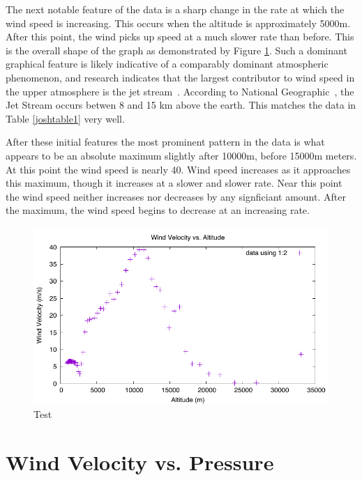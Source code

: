 \documentclass{article}
\begin{document}
The next notable feature of the data is a sharp change in the rate at which the wind speed is increasing.  This occurs when the altitude is approximately 5000\si{m}. After this point, the wind picks up speed at a much slower rate than before.  This is the overall shape of the graph as demonstrated by Figure \ref{josh1}.  Such a dominant graphical feature is likely indicative of a comparably dominant atmospheric phenomenon, and research indicates that the largest contributor to wind speed in the upper atmosphere is the jet stream~\cite{National-Geographic}.  According to National Geographic~\cite{National-Geographic}, the Jet Stream occurs betwen 8 and 15 \si{km} above the earth.  This matches the data in Table \ref{joshtable1} very well.

After these initial features the most prominent pattern in the data is what appears to be an absolute maximum slightly after 10000\si{m}, before 15000\si{m} meters.  At this point the wind speed is nearly 40\si{}.  Wind speed increases as it approaches this maximum, though it increases at a slower and slower rate. Near this point the wind speed neither increases nor decreases by any signficiant amount.  After the maximum, the wind speed begins to decrease at an increasing rate.


\begin{figure}
\centering
\includegraphics{josh-data/figure1.pdf}
\caption{Test}
\label{josh1}

\end{figure}



\part{Wind Velocity vs. Pressure}
\end{document}
